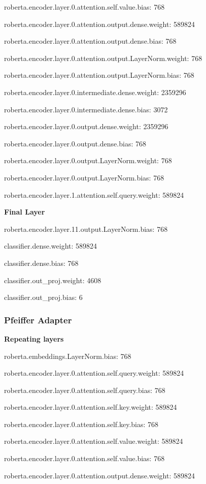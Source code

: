\documentclass[10pt,twocolumn,letterpaper]{article}
\begin{document}
roberta.encoder.layer.0.attention.self.value.bias: 768

roberta.encoder.layer.0.attention.output.dense.weight: 589824

roberta.encoder.layer.0.attention.output.dense.bias: 768

roberta.encoder.layer.0.attention.output.LayerNorm.weight: 768

roberta.encoder.layer.0.attention.output.LayerNorm.bias: 768

roberta.encoder.layer.0.intermediate.dense.weight: 2359296

roberta.encoder.layer.0.intermediate.dense.bias: 3072

roberta.encoder.layer.0.output.dense.weight: 2359296

roberta.encoder.layer.0.output.dense.bias: 768

roberta.encoder.layer.0.output.LayerNorm.weight: 768

roberta.encoder.layer.0.output.LayerNorm.bias: 768

roberta.encoder.layer.1.attention.self.query.weight: 589824


\textbf{Final Layer}

roberta.encoder.layer.11.output.LayerNorm.bias: 768

classifier.dense.weight: 589824

classifier.dense.bias: 768

classifier.out\_proj.weight: 4608

classifier.out\_proj.bias: 6

\subsubsection{Pfeiffer Adapter}
\label{sec:pfeiffermodel} 
\textbf{Repeating layers}

roberta.embeddings.LayerNorm.bias: 768

roberta.encoder.layer.0.attention.self.query.weight: 589824

roberta.encoder.layer.0.attention.self.query.bias: 768

roberta.encoder.layer.0.attention.self.key.weight: 589824

roberta.encoder.layer.0.attention.self.key.bias: 768

roberta.encoder.layer.0.attention.self.value.weight: 589824

roberta.encoder.layer.0.attention.self.value.bias: 768

roberta.encoder.layer.0.attention.output.dense.weight: 589824
\end{document}
